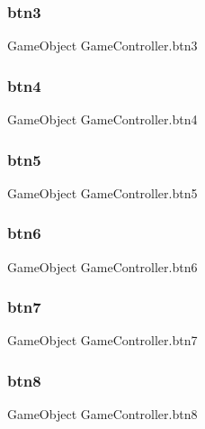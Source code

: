 \mbox{\label{class_game_controller_a60657597b7b3ca5bfb3cdf7c60b2f289}} 
\subsubsection{btn3}
{\footnotesize\ttfamily Game\+Object Game\+Controller.\+btn3}

\mbox{\label{class_game_controller_ad392f38152fcba858769cd3badea7c3f}} 
\subsubsection{btn4}
{\footnotesize\ttfamily Game\+Object Game\+Controller.\+btn4}

\mbox{\label{class_game_controller_a531663e0524487adc6a793c7ae7cb166}} 
\subsubsection{btn5}
{\footnotesize\ttfamily Game\+Object Game\+Controller.\+btn5}

\mbox{\label{class_game_controller_a2b292c3de099e4a556b089cb09773e0d}} 
\subsubsection{btn6}
{\footnotesize\ttfamily Game\+Object Game\+Controller.\+btn6}

\mbox{\label{class_game_controller_ad00b420a9a662a2e0b5f5563df5b88ce}} 
\subsubsection{btn7}
{\footnotesize\ttfamily Game\+Object Game\+Controller.\+btn7}

\mbox{\label{class_game_controller_a08d5596b4d2402bdb7596eae33dca170}} 
\subsubsection{btn8}
{\footnotesize\ttfamily Game\+Object Game\+Controller.\+btn8}

